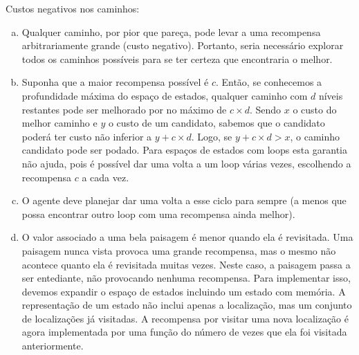 \begin{solution}
Custos negativos nos caminhos:
\begin{enumerate}[a.]
	\item Qualquer caminho, por pior que pareça, pode levar a uma recompensa arbitrariamente grande (custo negativo). Portanto, seria necessário explorar todos os caminhos possíveis para se ter certeza que encontraria o melhor.
	
	\item Suponha que a maior recompensa possível é $c$. Então, se conhecemos a profundidade máxima do espaço de estados, qualquer caminho com $d$ níveis restantes pode ser melhorado por no máximo de $c \times d$. Sendo $x$ o custo do melhor caminho e $y$ o custo de um candidato, sabemos que o candidato poderá ter custo não inferior a $y + c \times d$. Logo, se $y + c \times d > x$, o caminho candidato pode ser podado. Para espaços de estados com loops esta garantia não ajuda, pois é possível dar uma volta a um loop várias vezes, escolhendo a recompensa $c$ a cada vez. 
	
	\item O agente deve planejar dar uma volta a esse ciclo para sempre (a menos que possa encontrar outro loop com uma recompensa ainda melhor).
	
	\item O valor associado a uma bela paisagem é menor quando ela é revisitada. Uma paisagem nunca vista provoca uma grande recompensa, mas o mesmo não acontece quanto ela é revisitada muitas vezes. Neste caso, a paisagem passa a ser entediante, não provocando nenhuma recompensa. Para implementar isso, devemos expandir o espaço de estados incluindo um estado com memória. A representação de um estado não inclui apenas a localização, mas um conjunto de localizações já visitadas. A recompensa por visitar uma nova localização é agora implementada por uma função do número de vezes que ela foi visitada anteriormente.
\end{enumerate}
\end{solution}

